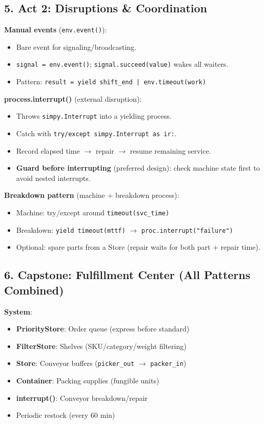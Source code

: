 \documentclass[11pt]{article}
\begin{document}
\subsection*{5. Act 2: Disruptions \& Coordination}
\textbf{Manual events} (\texttt{env.event()}):
\begin{itemize}[leftmargin=*]
\item Bare event for signaling/broadcasting.
\item \texttt{signal = env.event()}; \texttt{signal.succeed(value)} wakes all waiters.
\item Pattern: \texttt{result = yield shift\_end | env.timeout(work)}
\end{itemize}

\textbf{process.interrupt()} (external disruption):
\begin{itemize}[leftmargin=*]
\item Throws \texttt{simpy.Interrupt} into a yielding process.
\item Catch with \texttt{try/except simpy.Interrupt as ir:}.
\item Record elapsed time $\rightarrow$ repair $\rightarrow$ resume remaining service.
\item \textbf{Guard before interrupting} (preferred design): check machine state first to avoid nested interrupts.
\end{itemize}

\textbf{Breakdown pattern} (machine + breakdown process):
\begin{itemize}[leftmargin=*]
\item Machine: try/except around \texttt{timeout(svc\_time)}
\item Breakdown: \texttt{yield timeout(mttf)} $\rightarrow$ \texttt{proc.interrupt("failure")}
\item Optional: spare parts from a Store (repair waits for both part + repair time).
\end{itemize}

\subsection*{6. Capstone: Fulfillment Center (All Patterns Combined)}
\textbf{System}:
\begin{itemize}[leftmargin=*]
\item \textbf{PriorityStore}: Order queue (express before standard)
\item \textbf{FilterStore}: Shelves (SKU/category/weight filtering)
\item \textbf{Store}: Conveyor buffers (\texttt{picker\_out} $\rightarrow$ \texttt{packer\_in})
\item \textbf{Container}: Packing supplies (fungible units)
\item \textbf{interrupt()}: Conveyor breakdown/repair
\item Periodic restock (every 60 min)
\end{itemize}
\end{document}
